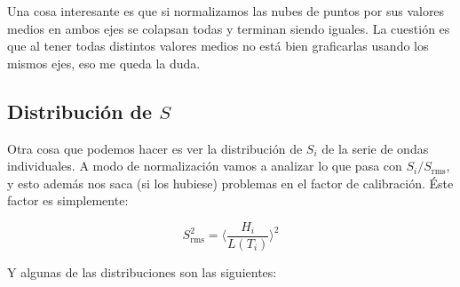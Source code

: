 Una cosa interesante es que si normalizamos las nubes de puntos por sus valores medios en ambos ejes se colapsan todas y terminan siendo iguales. La cuestión es que al tener todas distintos valores medios no está bien graficarlas usando los mismos ejes, eso me queda la duda. 

\subsection*{Distribución de $S$} 
Otra cosa que podemos hacer es ver la distribución de $S_i$ de la serie de ondas individuales. A modo de normalización vamos a analizar lo que pasa con $S_i/S_{\text{rms}}$, y esto además nos saca (si los hubiese) problemas en el factor de calibración. Éste factor es simplemente: 

\begin{equation}
	S_\text{rms}^2 = \langle\frac{H_i}{L(T_i)}\rangle^2 
\end{equation}

Y algunas de las distribuciones son las siguientes: 


